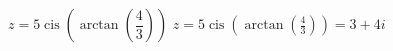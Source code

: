{ $z = 5\operatorname{cis}\left(\arctan\left(\dfrac{4}{3}\right)\right)$}
{ $z = 5\operatorname{cis}\left(\arctan\left(\frac{4}{3}\right)\right) = 3 + 4i$ }
